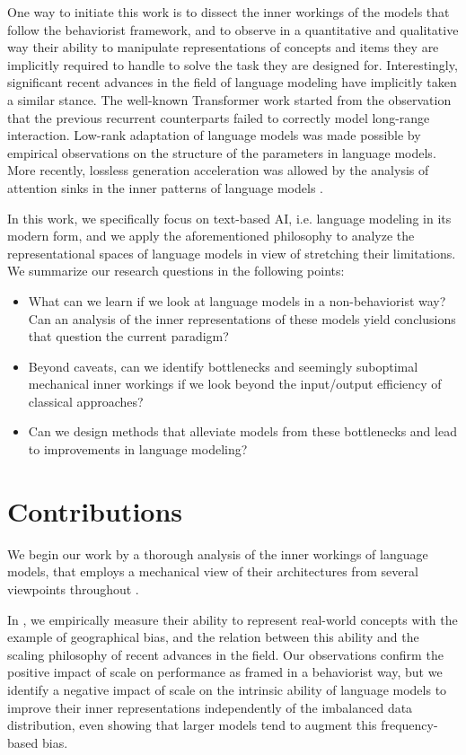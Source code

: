 One way to initiate this work is to dissect the inner workings of the models that follow the behaviorist framework, and to observe in a quantitative and qualitative way their ability to manipulate representations of concepts and items they are implicitly required to handle to solve the task they are designed for. Interestingly, significant recent advances in the field of language modeling have implicitly taken a similar stance. The well-known Transformer work \citep{vaswani2017attention} started from the observation that the previous recurrent counterparts failed to correctly model long-range interaction. Low-rank adaptation of language models \citep{hu2022lora} was made possible by empirical observations on the structure of the parameters in language models. More recently, lossless generation acceleration was allowed by the analysis of attention sinks in the inner patterns of language models \citep{xiao2024efficient}.

In this work, we specifically focus on text-based AI, i.e. language modeling in its modern form, and we apply the aforementioned philosophy to analyze the representational spaces of language models in view of stretching their limitations. We summarize our research questions in the following points:

\begin{itemize}
  \item What can we learn if we look at language models in a non-behaviorist way? Can an analysis of the inner representations of these models yield conclusions that question the current paradigm?
  \item Beyond caveats, can we identify bottlenecks and seemingly suboptimal mechanical inner workings if we look beyond the input/output efficiency of classical approaches?
  \item Can we design methods that alleviate models from these bottlenecks and lead to improvements in language modeling?
\end{itemize}

\section{Contributions}

We begin our work by a thorough analysis of the inner workings of language models, that employs a mechanical view of their architectures from several viewpoints throughout .

In , we empirically measure their ability to represent real-world concepts with the example of geographical bias, and the relation between this ability and the scaling philosophy of recent advances in the field. Our observations confirm the positive impact of scale on performance as framed in a behaviorist way, but we identify a negative impact of scale on the intrinsic ability of language models to improve their inner representations independently of the imbalanced data distribution, even showing that larger models tend to augment this frequency-based bias. 

